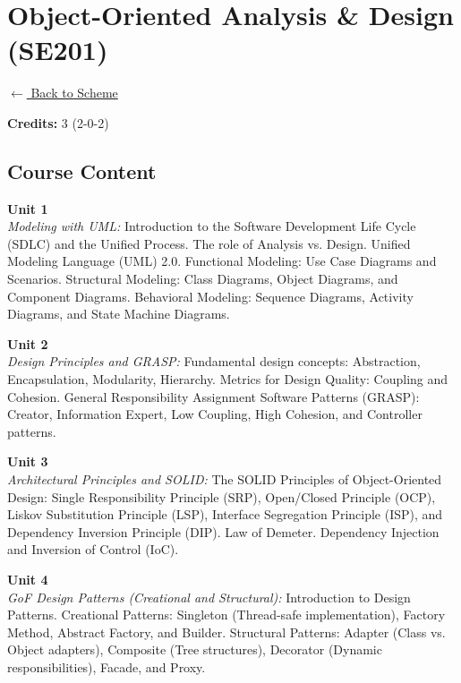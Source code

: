 \section*{Object-Oriented Analysis \& Design (SE201)}
\label{major:SE_1}

\noindent \small{\hyperref[main:scheme]{$\leftarrow$ Back to Scheme}} \vspace{0.5cm}

\noindent \textbf{Credits:} 3 (2-0-2)

\subsection*{Course Content}
\noindent\textbf{Unit 1} \\
\textit{Modeling with UML:} Introduction to the Software Development Life Cycle (SDLC) and the Unified Process. The role of Analysis vs. Design. Unified Modeling Language (UML) 2.0. Functional Modeling: Use Case Diagrams and Scenarios. Structural Modeling: Class Diagrams, Object Diagrams, and Component Diagrams. Behavioral Modeling: Sequence Diagrams, Activity Diagrams, and State Machine Diagrams.

\vspace{0.3cm}

\noindent\textbf{Unit 2} \\
\textit{Design Principles and GRASP:} Fundamental design concepts: Abstraction, Encapsulation, Modularity, Hierarchy. Metrics for Design Quality: Coupling and Cohesion. General Responsibility Assignment Software Patterns (GRASP): Creator, Information Expert, Low Coupling, High Cohesion, and Controller patterns.

\vspace{0.3cm}

\noindent\textbf{Unit 3} \\
\textit{Architectural Principles and SOLID:} The SOLID Principles of Object-Oriented Design: Single Responsibility Principle (SRP), Open/Closed Principle (OCP), Liskov Substitution Principle (LSP), Interface Segregation Principle (ISP), and Dependency Inversion Principle (DIP). Law of Demeter. Dependency Injection and Inversion of Control (IoC).

\vspace{0.3cm}

\noindent\textbf{Unit 4} \\
\textit{GoF Design Patterns (Creational and Structural):} Introduction to Design Patterns. Creational Patterns: Singleton (Thread-safe implementation), Factory Method, Abstract Factory, and Builder. Structural Patterns: Adapter (Class vs. Object adapters), Composite (Tree structures), Decorator (Dynamic responsibilities), Facade, and Proxy.

